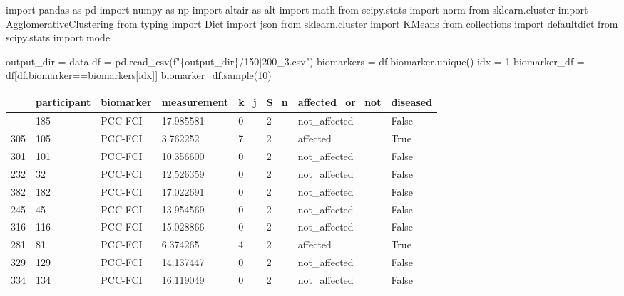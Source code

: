 \documentclass[
  letterpaper,
  DIV=11,
  numbers=noendperiod]{scrreprt}
\newenvironment{Shaded}{\begin{snugshade}}{\end{snugshade}}
\newcommand{\DecValTok}[1]{\textcolor[rgb]{0.68,0.00,0.00}{#1}}
\newcommand{\ImportTok}[1]{\textcolor[rgb]{0.00,0.46,0.62}{#1}}
\newcommand{\NormalTok}[1]{\textcolor[rgb]{0.00,0.23,0.31}{#1}}
\newcommand{\OperatorTok}[1]{\textcolor[rgb]{0.37,0.37,0.37}{#1}}
\newcommand{\SpecialCharTok}[1]{\textcolor[rgb]{0.37,0.37,0.37}{#1}}
\newcommand{\SpecialStringTok}[1]{\textcolor[rgb]{0.13,0.47,0.30}{#1}}
\newcommand{\StringTok}[1]{\textcolor[rgb]{0.13,0.47,0.30}{#1}}
\begin{document}
\begin{Shaded}
\begin{Highlighting}[]
\ImportTok{import}\NormalTok{ pandas }\ImportTok{as}\NormalTok{ pd}
\ImportTok{import}\NormalTok{ numpy }\ImportTok{as}\NormalTok{ np}
\ImportTok{import}\NormalTok{ altair }\ImportTok{as}\NormalTok{ alt }
\ImportTok{import}\NormalTok{ math }
\ImportTok{from}\NormalTok{ scipy.stats }\ImportTok{import}\NormalTok{ norm}
\ImportTok{from}\NormalTok{ sklearn.cluster }\ImportTok{import}\NormalTok{ AgglomerativeClustering}
\ImportTok{from}\NormalTok{ typing }\ImportTok{import}\NormalTok{ Dict}
\ImportTok{import}\NormalTok{ json }
\ImportTok{from}\NormalTok{ sklearn.cluster }\ImportTok{import}\NormalTok{ KMeans}
\ImportTok{from}\NormalTok{ collections }\ImportTok{import}\NormalTok{ defaultdict}
\ImportTok{from}\NormalTok{ scipy.stats }\ImportTok{import}\NormalTok{ mode}
\end{Highlighting}
\end{Shaded}

\begin{Shaded}
\begin{Highlighting}[]
\NormalTok{output\_dir }\OperatorTok{=} \StringTok{\textquotesingle{}data\textquotesingle{}}
\NormalTok{df }\OperatorTok{=}\NormalTok{ pd.read\_csv(}\SpecialStringTok{f"}\SpecialCharTok{\{}\NormalTok{output\_dir}\SpecialCharTok{\}}\SpecialStringTok{/150|200\_3.csv"}\NormalTok{)}
\NormalTok{biomarkers }\OperatorTok{=}\NormalTok{ df.biomarker.unique()}
\NormalTok{idx }\OperatorTok{=} \DecValTok{1}
\NormalTok{biomarker\_df }\OperatorTok{=}\NormalTok{ df[df.biomarker}\OperatorTok{==}\NormalTok{biomarkers[idx]]}
\NormalTok{biomarker\_df.sample(}\DecValTok{10}\NormalTok{)}
\end{Highlighting}
\end{Shaded}

\begin{longtable}[]{@{}llllllll@{}}
\toprule\noalign{}
& participant & biomarker & measurement & k\_j & S\_n &
affected\_or\_not & diseased \\
\midrule\noalign{}
\endhead
\bottomrule\noalign{}
\endlastfoot
385 & 185 & PCC-FCI & 17.985581 & 0 & 2 & not\_affected & False \\
305 & 105 & PCC-FCI & 3.762252 & 7 & 2 & affected & True \\
301 & 101 & PCC-FCI & 10.356600 & 0 & 2 & not\_affected & False \\
232 & 32 & PCC-FCI & 12.526359 & 0 & 2 & not\_affected & False \\
382 & 182 & PCC-FCI & 17.022691 & 0 & 2 & not\_affected & False \\
245 & 45 & PCC-FCI & 13.954569 & 0 & 2 & not\_affected & False \\
316 & 116 & PCC-FCI & 15.028866 & 0 & 2 & not\_affected & False \\
281 & 81 & PCC-FCI & 6.374265 & 4 & 2 & affected & True \\
329 & 129 & PCC-FCI & 14.137447 & 0 & 2 & not\_affected & False \\
334 & 134 & PCC-FCI & 16.119049 & 0 & 2 & not\_affected & False \\
\end{longtable}
\end{document}
